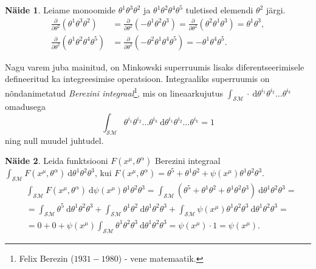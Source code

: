 \documentclass[12pt]{article}
\theoremstyle{plain}
\theoremstyle{definition}
\newtheorem{naide}{Näide}[section]
\numberwithin{equation}{section}
\def\SM{{\mathcal {SM}}}
\begin{document}
\begin{naide}
Leiame monoomide $\theta^1 \theta^3 \theta^2$ ja 
$\theta^1 \theta^2 \theta^4 \theta^5$ tuletised elemendi 
$\theta^2$ järgi.
\begin{align*}
\frac{\partial}{\partial \theta^2} 
	\left( \theta^1 \theta^3 \theta^2\right) &= 
\frac{\partial}{\partial \theta^2} 
	\left(-\theta^1 \theta^2 \theta^3 \right) = 
\frac{\partial}{\partial \theta^2} 
	\left(\theta^2 \theta^1 \theta^3 \right) = \theta^1 \theta^3,\\
%
\frac{\partial}{\partial \theta^2} 
	\left( \theta^1 \theta^2 \theta^4 \theta^5 \right) &= 
\frac{\partial}{\partial \theta^2} 
	\left(- \theta^2 \theta^1 \theta^4 \theta^5 \right) = 
	- \theta^1 \theta^4 \theta^5.
\end{align*}
\end{naide}

Nagu varem juba mainitud, on Minkowski superruumis lisaks 
diferentseerimisele defineeritud ka integreesimise operatsioon. 
Integraaliks superruumis on nõnda\-nimetatud \emph{Berezini 
integraal}\footnote{Felix Berezin ($1931 - 1980$) - vene 
matemaatik.}, mis on lineaarkujutus $\int_{\SM} 
\cdot \ \mathrm{d} \theta^{i_1} \theta^{i_2} \ldots \theta^{i_k}$ 
omadusega
\[\int_{\SM} \theta^{i_1} \theta^{i_2} 
	\ldots \theta^{i_k} \ 
	\mathrm{d} \theta^{i_1} \theta^{i_2} \ldots \theta^{i_k} = 1\]
ning null muudel juhtudel.

\begin{naide}
Leida funktsiooni $F\left(x^{\mu}, \theta^{\alpha}\right)$ 
Berezini integraal $\int_{\SM} F\left(x^{\mu}, 
\theta^{\alpha}\right) \ \mathrm{d} \theta^1 \theta^2 
\theta^3$, kui $F\left(x^{\mu}, \theta^{\alpha}\right) = 
	\theta^5 + \theta^1 \theta^2 + 
	\psi\left(x^{\mu}\right) \theta^1 \theta^2 \theta^3$.
\begin{align*}
&\int_{\SM} F\left(x^{\mu}, 
	\theta^{\alpha}\right) \ \mathrm{d} 
	\psi\left(x^{\mu}\right) \theta^1 \theta^2 \theta^3 = 
\int_{\SM} \left(\theta^5 + \theta^1 \theta^2 + 
	\theta^1 \theta^2 \theta^3\right) \ 
	\mathrm{d} \theta^1 \theta^2 \theta^3 = \\
&= \int_{\SM} \theta^5 \ \mathrm{d} \theta^1 \theta^2 \theta^3 +
\int_{\SM} \theta^1 \theta^2 \ 
	\mathrm{d} \theta^1 \theta^2 \theta^3 + 
\int_{\SM} \psi\left(x^{\mu}\right) 
	\theta^1 \theta^2 \theta^3 \ 
	\mathrm{d} \theta^1 \theta^2 \theta^3 = \\
&= 0 + 0 + \psi\left(x^{\mu}\right) 
	\int_{\SM} \theta^1 \theta^2 \theta^3 \ 
	\mathrm{d} \theta^1 \theta^2 \theta^3= 
	\psi\left(x^{\mu}\right) \cdot 1 = \psi\left(x^{\mu}\right).
\end{align*}
\end{naide}
\end{document}
